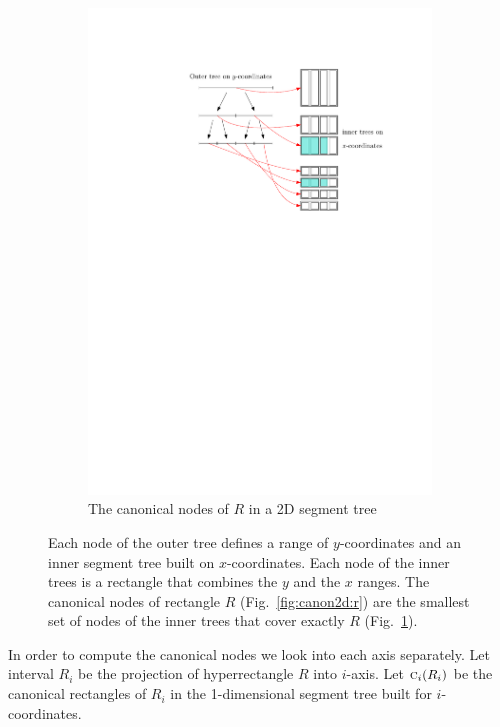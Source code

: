 \documentclass[english,gradu]{tktltiki2018}
\begin{document}
\begin{figure}
\begin{subfigure}[t]{0.75\textwidth}
		\includegraphics[width=\textwidth,page=1]{fig/segtree2d}
		\caption{The canonical nodes of $R$ in a 2D segment tree}\label{fig:canon2d:tree}
	\end{subfigure}
	\caption{Each node of the outer tree defines a range of $y$-coordinates and an inner segment tree built on $x$-coordinates.
	Each node of the inner trees is a rectangle that combines the $y$ and the $x$ ranges.
	The canonical nodes of rectangle $R$ (Fig.~\ref{fig:canon2d:r}) are the smallest set of nodes of the inner trees that cover exactly $R$ (Fig.~\ref{fig:canon2d:tree}).}\label{fig:canon2d}
\end{figure}

In order to compute the canonical nodes we look into each axis separately.
Let interval $R_i$ be the projection of hyperrectangle $R$ into $i$-axis.
Let $\canoni{R_i}{i}$ be the canonical rectangles of $R_i$ in the 1-dimensional segment tree built for $i$-coordinates.
\end{document}
